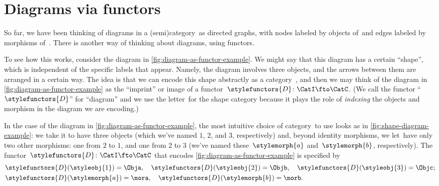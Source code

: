 
\section{Diagrams via functors}

So far, we have been thinking of diagrams in a (semi)category~\CatC as directed graphs, with nodes labeled by objects of~\CatC and edges labeled by morphisms of~\CatC.
There is another way of thinking about diagrams, using functors.

To see how this works, consider the diagram in \cref{fig:diagram-as-functor-example}.
We might say that this diagram has a certain ``shape'', which is independent of the specific labels that appear.
Namely, the diagram involves three objects, and the arrows between them are arranged in a certain way.
The idea is that we can encode this shape abstractly as a category~\CatI, and then we may think of the diagram in \cref{fig:diagram-as-functor-example} as the ``imprint'' or image of a functor~$\stylefunctors{D}\colon \CatI \fto \CatC$.
(We call the functor ``$\stylefunctors{D}$'' for ``diagram'' and we use the letter~\CatI for the shape category because it plays the role of \emph{indexing} the objects and morphism in the diagram we are encoding.)

\begin{marginfigure}
    \centering
    \caption{}
    \label{fig:diagram-as-functor-example}
\end{marginfigure}

\begin{marginfigure}
    \centering
    \caption{}
    \label{fig:shape-diagram-example}
\end{marginfigure}

In the case of the diagram in \cref{fig:diagram-as-functor-example}, the most intuitive choice of category~\CatI to use looks as in \cref{fig:shape-diagram-example}: we take it to have three objects (which we've named $1$, $2$, and $3$, respectively) and, beyond identity morphisms, we let~\CatI have only two other morphisms: one from $2$ to $1$, and one from $2$ to $3$ (we've named these~$\stylemorph{a}$ and~$\stylemorph{b}$, respectively).
The functor~$\stylefunctors{D}\colon \CatI \fto \CatC$ that encodes \cref{fig:diagram-as-functor-example} is specified by
\begin{align}
     & \stylefunctors{D}(\styleobj{1}) = \Obja, \quad \stylefunctors{D}(\styleobj{2}) = \Objb, \quad  \stylefunctors{D}(\styleobj{3}) = \Objc; \\
     & \stylefunctors{D}(\stylemorph{a}) = \mora, \quad \stylefunctors{D}(\stylemorph{b}) = \morb.
\end{align}


